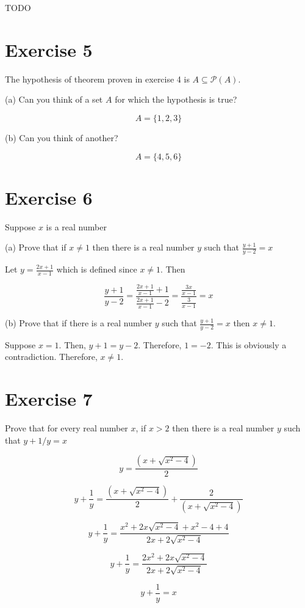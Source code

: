 \documentclass[11pt]{article}
\newcommand{\powerset}[1]{\mathscr{P}(#1)}
\begin{document}
TODO

\section*{Exercise 5}

The hypothesis of theorem proven in exercise 4 is $A \subseteq \powerset{A}$.

\noindent (a) Can you think of a set $A$ for which the hypothesis is true?

$$A = \{1,2,3\}$$

\noindent (b) Can you think of another?

$$A = \{4,5,6\}$$

\section*{Exercise 6}

Suppose $x$ is a real number

\noindent (a) Prove that if $x \neq 1$ then there is a real number $y$ such that 
$\frac{y + 1}{y - 2} = x$

Let $y = \frac{2x + 1}{x - 1}$ which is defined since $x \neq 1$. Then 

$$\frac{y + 1}{y - 2} = 
\frac{\frac{2x + 1}{x - 1} + 1}{\frac{2x + 1}{x - 1} - 2} =
\frac{\frac{3x}{x-1}}{\frac{3}{x - 1}} =
x$$

\noindent (b) Prove that if there is a real number $y$ such that 
$\frac{y + 1}{y - 2} = x$ then $x \neq 1$.

Suppose $x = 1$. Then, $y + 1 = y - 2$. Therefore, $1 = -2$. This is obviously 
a contradiction. Therefore, $x \neq 1$.

\section*{Exercise 7}

Prove that for every real number $x$, if $x > 2$ then there is a real number 
$y$ such that $y + 1/y = x$

$$y = \frac{(x + \sqrt{x^2 - 4})}{2}$$

$$y + \frac{1}{y} = \frac{(x + \sqrt{x^2 - 4})}{2} + \frac{2}{(x + \sqrt{x^2 - 4})}$$

$$y + \frac{1}{y} = \frac{x^2 + 2x \sqrt{x^2 - 4} + x^2 - 4 + 4}{2x + 2 \sqrt{x^2 - 4}}$$

$$y + \frac{1}{y} = \frac{2x^2 + 2x \sqrt{x^2 - 4}}{2x + 2 \sqrt{x^2 - 4}}$$

$$y + \frac{1}{y} = x$$
\end{document}
